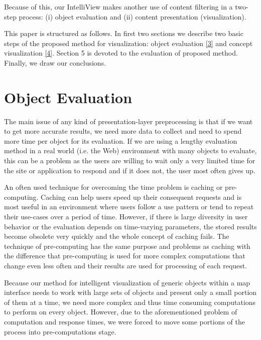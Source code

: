 \documentclass[6pt]{article}
\begin{document}
Because of this, our IntelliView makes another use of content filtering in a two-step process: (i) object evaluation and (ii) content presentation (visualization).

This paper is structured as follows. In first two sections we describe two basic steps of the proposed method for visualization: object evaluation \ref{3} and concept visualization \ref{4}. Section 5 is devoted to the evaluation of proposed method. Finally, we draw our conclusions.



\section{Object Evaluation}
The main issue of any kind of presentation-layer preprocessing is that if we want to get more accurate results, we need more data to collect and need to spend more time per object for its evaluation. If we are using a lengthy evaluation method in a real world (i.e. the Web) environment with many objects to evaluate, this can be a problem as the users are willing to wait only a very limited time for the site or application to respond and if it does not, the user most often gives up.

An often used technique for overcoming the time problem is caching or pre-computing. Caching can help users speed up their consequent requests and is most useful in an environment where users follow a use pattern or tend to repeat their use-cases over a period of time. However, if there is large diversity in user behavior or the evaluation depends on time-varying parameters, the stored results become obsolete very quickly and the whole concept of caching fails. The technique of pre-computing has the same purpose and problems as caching with the difference that pre-computing is used for more complex computations that change even less often and their results are used for processing of each request.

Because our method for intelligent visualization of generic objects within a map interface needs to work with large sets of objects and present only a small portion of them at a time, we need more complex and thus time consuming computations to perform on every object. However, due to the aforementioned problem of computation and response times, we were forced to move some portions of the process into pre-computations stage.
\end{document}
